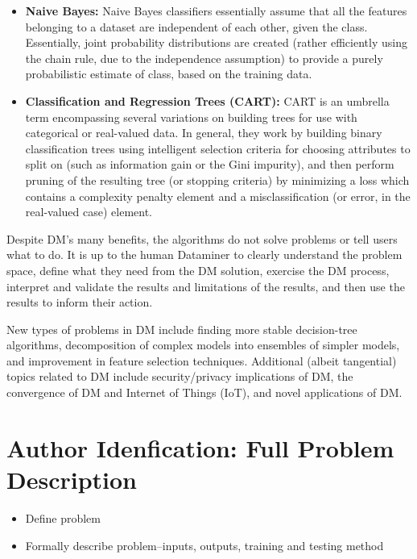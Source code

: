 \documentclass[fleqn,10pt]{SelfArx} %
\begin{document}
\begin{itemize}
	\item{\textbf{Naive Bayes:}} Naive Bayes classifiers essentially assume that all the features belonging to a dataset are independent of each other, given the class.  Essentially, joint probability distributions are created (rather efficiently using the chain rule, due to the independence assumption) to provide a purely probabilistic estimate of class, based on the training data.
	\item{\textbf{Classification and Regression Trees (CART):}} CART is an umbrella term encompassing several variations on building trees for use with categorical or real-valued data.  In general, they work by building binary classification trees using intelligent selection criteria for choosing attributes to split on (such as information gain or the Gini impurity), and then perform pruning of the resulting tree (or stopping criteria) by minimizing a loss which contains a complexity penalty element and a misclassification (or error, in the real-valued case) element.
\end{itemize}

Despite DM's many benefits, the algorithms do not solve problems or tell users what to do.  It is up to the human Dataminer to clearly understand the problem space, define what they need from the DM solution, exercise the DM process, interpret and validate the results and limitations of the results, and then use the results to inform their action.

New types of problems in DM include finding more stable decision-tree algorithms, decomposition of complex models into ensembles of simpler models, and improvement in feature selection techniques. \cite{Wu:2007:TAD:1327434.1327436} Additional (albeit tangential) topics related to DM include security/privacy implications of DM, the convergence of DM and Internet of Things (IoT), and novel applications of DM.






%
%   
\section{Author Idenfication: Full Problem Description}
\begin{itemize}[noitemsep]
\item Define problem
\item Formally describe problem--inputs, outputs, training and testing method
\end{itemize}
\end{document}
